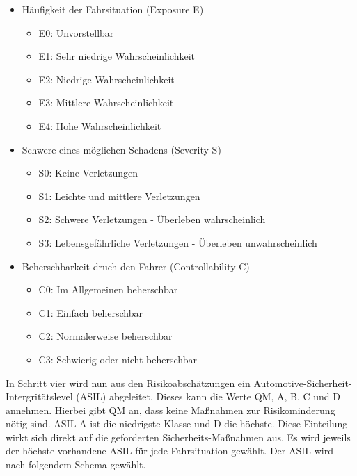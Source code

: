 \documentclass[a4paper,DIV=calc,ngerman]{scrartcl}
\begin{document}
\begin{itemize}
    \item Häufigkeit der Fahrsituation (Exposure E)
    \begin{itemize}
        \item E0: Unvorstellbar
        \item E1: Sehr niedrige Wahrscheinlichkeit
        \item E2: Niedrige Wahrscheinlichkeit
        \item E3: Mittlere Wahrscheinlichkeit
        \item E4: Hohe Wahrscheinlichkeit
    \end{itemize}
    \item Schwere eines möglichen Schadens (Severity S)
    \begin{itemize}
        \item S0: Keine Verletzungen
        \item S1: Leichte und mittlere Verletzungen
        \item S2: Schwere Verletzungen - Überleben wahrscheinlich
        \item S3: Lebensgefährliche Verletzungen - Überleben unwahrscheinlich
    \end{itemize}
    \item Beherschbarkeit druch den Fahrer (Controllability C)
    \begin{itemize}
        \item C0: Im Allgemeinen beherschbar
        \item C1: Einfach beherschbar
        \item C2: Normalerweise beherschbar
        \item C3: Schwierig oder nicht beherschbar
    \end{itemize}
\end{itemize}

In Schritt vier wird nun aus den Risikoabschätzungen ein Automotive-Sicherheit-Intergritätslevel (ASIL) abgeleitet. Dieses kann die Werte QM, A, B, C und D annehmen. Hierbei gibt QM an, dass keine Maßnahmen zur Risikominderung nötig sind. ASIL A ist die niedrigste Klasse und D die höchste. Diese Einteilung wirkt sich direkt auf die geforderten Sicherheits-Maßnahmen aus. Es wird jeweils der höchste vorhandene ASIL für jede Fahrsituation gewählt. Der ASIL wird nach folgendem Schema gewählt.
\end{document}

